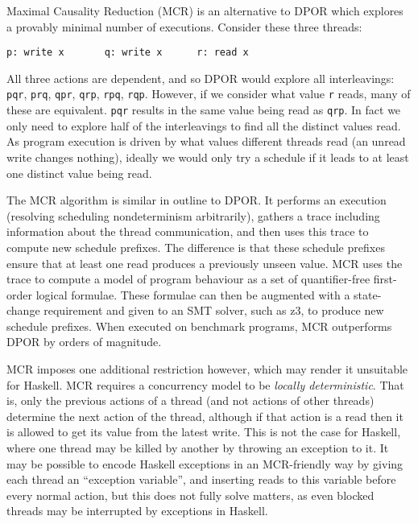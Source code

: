 Maximal Causality Reduction (MCR)\cite{huang2017,huang2015} is an alternative to
DPOR which explores a provably minimal number of executions.  Consider these
three threads:

\begin{center}
\verb|p: write x       q: write x      r: read x|
\end{center}

All three actions are dependent, and so DPOR would explore all interleavings:
\texttt{pqr}, \texttt{prq}, \texttt{qpr}, \texttt{qrp}, \texttt{rpq}, \texttt{rqp}.
However, if we consider what value \texttt{r} reads, many of these are
equivalent.  \texttt{pqr} results in the same value being read as \texttt{qrp}.
In fact we only need to explore half of the interleavings to find all the
distinct values read.  As program execution is driven by what values different
threads read (an unread write changes nothing), ideally we would only try a
schedule if it leads to at least one distinct value being read.

The MCR algorithm is similar in outline to DPOR\@.  It performs an execution
(resolving scheduling nondeterminism arbitrarily), gathers a trace including
information about the thread communication, and then uses this trace to compute
new schedule prefixes.  The difference is that these schedule prefixes ensure
that at least one read produces a previously unseen value.  MCR uses the trace
to compute a model of program behaviour as a set of quantifier-free first-order
logical formulae.  These formulae can then be augmented with a state-change
requirement and given to an SMT solver, such as z3, to produce new schedule
prefixes.  When executed on benchmark programs, MCR outperforms DPOR by orders
of magnitude\cite{huang2017}.

MCR imposes one additional restriction however, which may render it unsuitable
for Haskell.  MCR requires a concurrency model to be \emph{locally
deterministic}\cite{huang2015}.  That is, only the previous actions of a thread
(and not actions of other threads) determine the next action of the thread,
although if that action is a read then it is allowed to get its value from the
latest write.  This is not the case for Haskell, where one thread may be killed
by another by throwing an exception to it.  It may be possible to encode Haskell
exceptions in an MCR-friendly way by giving each thread an ``exception
variable'', and inserting reads to this variable before every normal action, but
this does not fully solve matters, as even blocked threads may be interrupted by
exceptions in Haskell.


